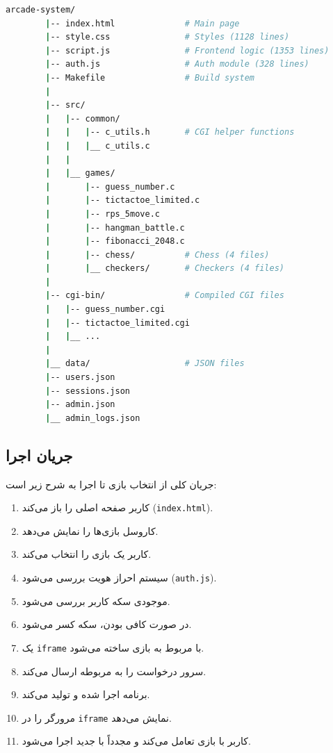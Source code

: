 \documentclass[12pt,a4paper]{article}
\begin{document}
\begin{latin}
	\begin{lstlisting}[language=bash, caption=ساختار پوشه‌ها]
		arcade-system/
		|-- index.html              # Main page
		|-- style.css               # Styles (1128 lines)
		|-- script.js               # Frontend logic (1353 lines)
		|-- auth.js                 # Auth module (328 lines)
		|-- Makefile                # Build system
		|
		|-- src/
		|   |-- common/
		|   |   |-- c_utils.h       # CGI helper functions
		|   |   |__ c_utils.c
		|   |
		|   |__ games/
		|       |-- guess_number.c
		|       |-- tictactoe_limited.c
		|       |-- rps_5move.c
		|       |-- hangman_battle.c
		|       |-- fibonacci_2048.c
		|       |-- chess/          # Chess (4 files)
		|       |__ checkers/       # Checkers (4 files)
		|
		|-- cgi-bin/                # Compiled CGI files
		|   |-- guess_number.cgi
		|   |-- tictactoe_limited.cgi
		|   |__ ...
		|
		|__ data/                   # JSON files
		|-- users.json
		|-- sessions.json
		|-- admin.json
		|__ admin_logs.json
	\end{lstlisting}
\end{latin}
	
	\subsection{جریان اجرا}
	
	جریان کلی از انتخاب بازی تا اجرا به شرح زیر است:
	
	\begin{enumerate}
		\item کاربر صفحه اصلی را باز می‌کند (\texttt{index.html}).
		\item {} کاروسل بازی‌ها را نمایش می‌دهد.
		\item کاربر یک بازی را انتخاب می‌کند.
		\item سیستم احراز هویت بررسی می‌شود (\texttt{auth.js}).
		\item موجودی سکه کاربر بررسی می‌شود.
		\item در صورت کافی بودن، سکه کسر می‌شود.
		\item یک \texttt{iframe} با  مربوط به بازی ساخته می‌شود.
		\item سرور  درخواست را به  مربوطه ارسال می‌کند.
		\item برنامه  اجرا شده و  تولید می‌کند.
		\item مرورگر  را در \texttt{iframe} نمایش می‌دهد.
		\item کاربر با بازی تعامل می‌کند و  مجدداً با  جدید اجرا می‌شود.
	\end{enumerate}
	
\end{document}
